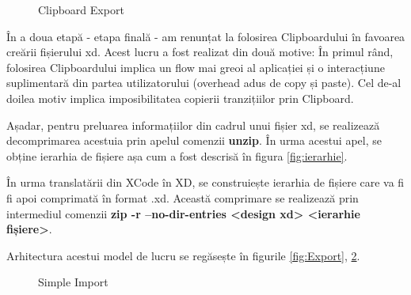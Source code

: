 \begin{figure}[!htbp]
\centering
{}
\caption{Clipboard Export} \label{fig:Clipboard Export}
\end{figure}


În a doua etapă - etapa finală - am renunțat la folosirea Clipboardului în favoarea creării fișierului xd. 
Acest lucru a fost realizat din două motive: În primul rând, folosirea Clipboardului implica un flow mai greoi al aplicației și o interacțiune suplimentară din partea utilizatorului (overhead adus de copy și paste). Cel de-al doilea motiv implica imposibilitatea copierii tranzițiilor prin Clipboard.

Așadar, pentru preluarea informațiilor din cadrul unui fișier xd, se realizează decomprimarea acestuia prin apelul comenzii \textbf{unzip}. În urma acestui apel, se obține ierarhia de fișiere așa cum a fost descrisă în figura \ref{fig:ierarhie}.

În urma translatării din XCode în XD, se construiește ierarhia de fișiere care va fi fi apoi comprimată în format .xd. Această comprimare se realizează prin intermediul comenzii \textbf{zip -r --no-dir-entries <design xd> <ierarhie fișiere>}. 

Arhitectura acestui model de lucru se regăsește în figurile \ref{fig:Export}, \ref{fig:Import}.

\begin{figure}[!htbp]
\centering
{}
\caption{Simple Import} \label{fig:Import}
\end{figure}

